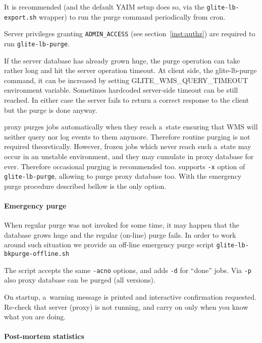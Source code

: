 It is recommended (and the default YAIM setup does so, via
the \verb'glite-lb-export.sh' wrapper) to run the purge
command periodically from cron.

Server privileges granting \verb'ADMIN_ACCESS' (see section~\ref{inst:authz}) are required to run \verb'glite-lb-purge'.

If the server database has already grown huge, the purge operation can take
rather long and hit the \LB server operation timeout. At client side, \ie the
glite-lb-purge command, it can be increased by setting GLITE\_WMS\_QUERY\_TIMEOUT
environment variable.
Sometimes hardcoded server-side timeout can be still reached. In either case the
server fails to return a correct response to the client but the purge is done anyway. 

\LB proxy purges jobs automatically when they reach a~state ensuring that WMS will
neither query nor log events to them anymore.
Therefore routine purging is not required theoretically.
However, frozen jobs which never reach such a~state may occur in an unstable environment,
and they may cumulate in \LB proxy database for ever.
Therefore occasional purging is recommended too.
 supports \verb'-x' option of \verb'glite-lb-purge', allowing
to purge \LB proxy database too.
With  the emergency purge procedure described bellow is the only option.

\paragraph{Emergency purge}

When regular purge was not invoked for some time, it may happen that 
the database grows huge and the regular (on-line) purge fails.
In order to work around such situation we provide an off-line emergency
purge script \verb'glite-lb-bkpurge-offline.sh'

The script accepts the same \verb'-acno' options, and adds \verb'-d' for ``done'' jobs. 
Via \verb'-p' also \LB proxy database can be purged (all \LB versions).

On startup, a~warning message is printed and interactive confirmation
requested.
Re-check that \LB server (proxy) is not running, and carry on only when you
know what you are doing.

\paragraph{Post-mortem statistics}

